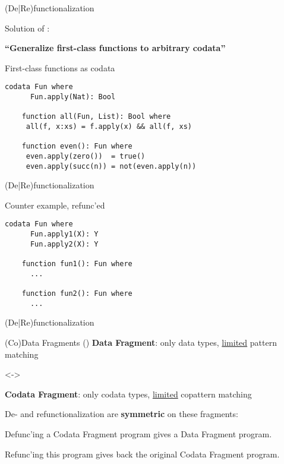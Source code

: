 \documentclass[xcolor=svgnames]{beamer}
\begin{document}
\begin{frame}[fragile]
  {(De|Re)functionalization}

Solution of \citet{rendel15automatic}: 

\textbf{``Generalize first-class functions to arbitrary codata''}

\begin{block}{First-class functions as codata}
    \begin{lstlisting}[escapechar=!]
    codata Fun where
      Fun.apply(Nat): Bool

    function all(Fun, List): Bool where
     all(f, x:xs) = f.apply(x) && all(f, xs)

    function even(): Fun where
     even.apply(zero())  = true()
     even.apply(succ(n)) = not(even.apply(n))
    \end{lstlisting}
  \end{block}

\end{frame}

\begin{frame}[fragile]
  {(De|Re)functionalization}
  \begin{block}{Counter example, refunc'ed}
    \begin{lstlisting}[escapechar=!]
    codata Fun where
      Fun.apply1(X): Y
      Fun.apply2(X): Y

    function fun1(): Fun where
      ...
    
    function fun2(): Fun where
      ...
    \end{lstlisting}
  \end{block}
\end{frame}

\begin{frame}
  {(De|Re)functionalization}

\begin{block}{(Co)Data Fragments (\citeauthor{rendel15automatic})}
  \textbf{Data Fragment}: only data types, \underline{limited} pattern matching

  <->

  \textbf{Codata Fragment}: only codata types, \underline{limited} copattern matching
\end{block}

De- and refunctionalization are \textbf{symmetric} on these fragments:

Defunc'ing a Codata Fragment program gives a Data Fragment program.

Refunc'ing this program gives back the original Codata Fragment program.

\end{frame}
\end{document}
